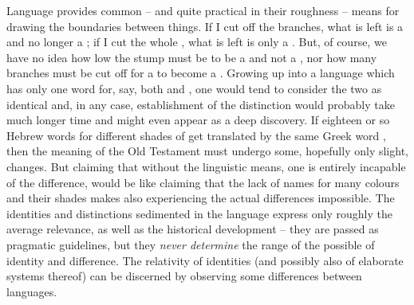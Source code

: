 
\pa\label{pa:language} Language provides common -- and quite practical in their
roughness -- means for drawing the boundaries between things.  If I cut off the
branches, what is left is a  and no longer a ; if I cut the
whole , what is left is only a .  But, of course, we have
no idea how low the stump must be to be a  and not a , nor
how many branches must be cut off for a  to become a .
Growing up into a language which has only one word for, say, both  and
, one would tend to consider the two as identical and, in any
case,  establishment of the distinction would probably take much
longer time and might even appear as a deep discovery.  If eighteen or so Hebrew
words for different shades of  get translated by the same Greek word
, then the meaning of the Old Testament must undergo some,
hopefully only slight, changes.
But claiming that without the linguistic means, one is entirely incapable of
 the difference, would be like claiming that the lack of names
for many colours and their shades makes also experiencing the actual differences
impossible. The identities and distinctions sedimented in the language express
only roughly the average relevance, as well as the historical development --
they are passed as pragmatic guidelines, but they {\em never determine} the
range of the possible  of identity and difference.  The relativity of identities (and possibly also of
elaborate systems thereof) can be discerned by observing some differences
between languages.

